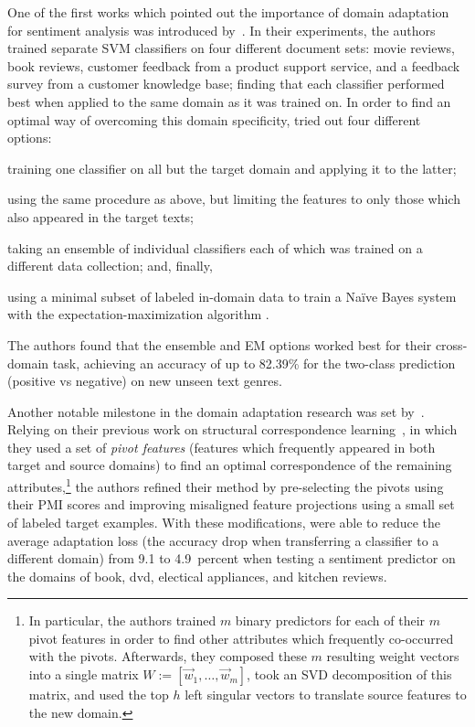 One of the first works which pointed out the importance of domain
adaptation for sentiment analysis was introduced by~\citet{Aue:05}.
In their experiments, the authors trained separate SVM classifiers on
four different document sets: movie reviews, book reviews, customer
feedback from a product support service, and a feedback survey from a
customer knowledge base; finding that each classifier performed best
when applied to the same domain as it was trained on.  In order to
find an optimal way of overcoming this domain specificity,
\citet{Aue:05} tried out four different options:
\begin{inparaenum}[(i)]
\item\label{sent-cgsa:lst:rel-wrk1} training one classifier on all but
  the target domain and applying it to the latter;
\item using the same procedure as above, but limiting the features to
  only those which also appeared in the target texts;
\item taking an ensemble of individual classifiers each of which was
  trained on a different data collection; and, finally,
\item using a minimal subset of labeled in-domain data to train a
  Na{\"i}ve Bayes system with the expectation-maximization algorithm
  \cite[EM;][]{Dempster:77}.
\end{inparaenum}
The authors found that the ensemble and EM options worked best for
their cross-domain task, achieving an accuracy of up to 82.39\% for
the two-class prediction (positive vs negative) on new unseen text
genres.

Another notable milestone in the domain adaptation research was set
by~\citet{Blitzer:07}.  Relying on their previous work on structural
correspondence learning~\cite{Blitzer:07}, in which they used a set of
\emph{pivot features} (features which frequently appeared in both
target and source domains) to find an optimal correspondence of the
remaining attributes,\footnote{In particular, the authors trained $m$
  binary predictors for each of their $m$ pivot features in order to
  find other attributes which frequently co-occurred with the pivots.
  Afterwards, they composed these $m$ resulting weight vectors into a
  single matrix $W := [\vec{w}_{1},\ldots,\vec{w}_{m}]$, took an SVD
  decomposition of this matrix, and used the top $h$ left singular
  vectors to translate source features to the new domain.} the authors
refined their method by pre-selecting the pivots using their PMI
scores and improving misaligned feature projections using a small set
of labeled target examples.  With these modifications,
\citeauthor{Blitzer:07} were able to reduce the average adaptation
loss (the accuracy drop when transferring a classifier to a different
domain) from 9.1 to 4.9~percent when testing a sentiment predictor on
the domains of book, dvd, electical appliances, and kitchen reviews.


